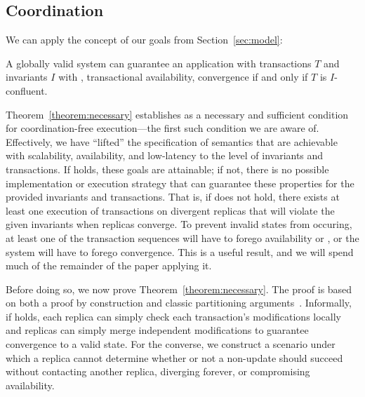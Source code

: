 \subsection{Coordination}

We can apply the concept of \iconfluence our goals from
Section~\ref{sec:model}:

\begin{theorem}
\label{theorem:necessary}
A globally valid system can guarantee an application with transactions
$T$ and invariants $I$ with \cfreedom, transactional availability,
convergence if and only if $T$ is $I$-confluent.
\end{theorem}

Theorem~\ref{theorem:necessary} establishes \iconfluence as a
necessary and sufficient condition for coordination-free
execution---the first such condition we are aware of. Effectively, we
have ``lifted'' the specification of semantics that are achievable
with scalability, availability, and low-latency to the level of
invariants and transactions. If \iconfluence holds, these goals are
attainable; if not, there is no possible implementation or execution
strategy that can guarantee these properties for the provided
invariants and transactions. That is, if \iconfluence does not hold,
there exists at least one execution of transactions on divergent
replicas that will violate the given invariants when replicas
converge. To prevent invalid states from occuring, at least one of the
transaction sequences will have to forego availability or \cfreedom,
or the system will have to forego convergence. This is a useful
result, and we will spend much of the remainder of the paper applying
it.

Before doing so, we now prove Theorem~\ref{theorem:necessary}. The
proof is based on both a proof by construction and classic
partitioning arguments~\cite{gilbert-cap}. Informally, if \iconfluence
holds, each replica can simply check each transaction's modifications
locally and replicas can simply merge independent modifications to
guarantee convergence to a valid state. For the converse, we construct
a scenario under which a replica cannot determine whether or not a
non-\iconfluent update should succeed without contacting another
replica, diverging forever, or compromising availability.

